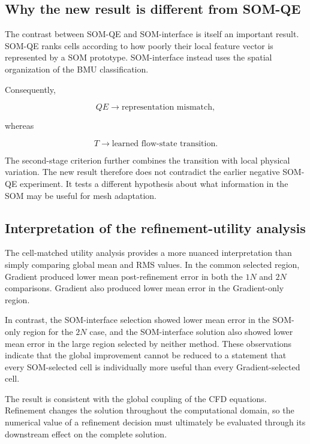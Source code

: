 \subsection{Why the new result is different from SOM-QE}

The contrast between SOM-QE and SOM-interface is itself an important result.
SOM-QE ranks cells according to how poorly their local feature vector is
represented by a SOM prototype. SOM-interface instead uses the spatial
organization of the BMU classification.

Consequently,

\begin{equation}
QE
\rightarrow
\text{representation mismatch},
\end{equation}

whereas

\begin{equation}
T
\rightarrow
\text{learned flow-state transition}.
\end{equation}

The second-stage criterion further combines the transition with local
physical variation. The new result therefore does not contradict the
earlier negative SOM-QE experiment. It tests a different hypothesis about
what information in the SOM may be useful for mesh adaptation.

\subsection{Interpretation of the refinement-utility analysis}

The cell-matched utility analysis provides a more nuanced interpretation
than simply comparing global mean and RMS values. In the common selected
region, Gradient produced lower mean post-refinement error in both the
\(1N\) and \(2N\) comparisons. Gradient also produced lower mean error in the
Gradient-only region.

In contrast, the SOM-interface selection showed lower mean error in the
SOM-only region for the \(2N\) case, and the SOM-interface solution also
showed lower mean error in the large region selected by neither method.
These observations indicate that the global improvement cannot be reduced
to a statement that every SOM-selected cell is individually more useful
than every Gradient-selected cell.

The result is consistent with the global coupling of the CFD equations.
Refinement changes the solution throughout the computational domain, so
the numerical value of a refinement decision must ultimately be evaluated
through its downstream effect on the complete solution.

